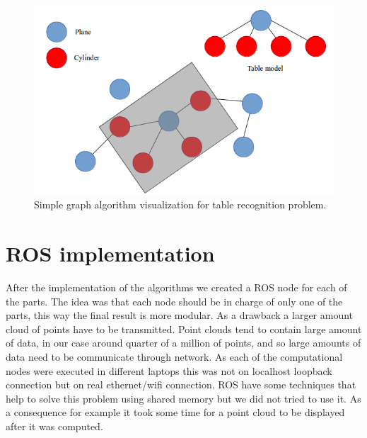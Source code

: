 \documentclass[fontsize=12pt]{article}
\begin{document}
\begin{figure}
  \includegraphics[scale=0.5]{images/graph}
  \caption{Simple graph algorithm visualization for table recognition problem.}
  \label{graphAlg}
\end{figure}
\section{ROS implementation} 
\label{sec:ros_implementation}

After the implementation of the algorithms we created a ROS node for each of the parts. The idea was that each node should be in charge of only one of the parts, this way the final result is more modular. As a drawback a larger amount cloud of points have to be transmitted. Point clouds tend to contain large amount of data, in our case around quarter of a million of points, and so large amounts of data need to be communicate through network. As each of the computational nodes were executed in different laptops this was not on localhost loopback connection but on real ethernet/wifi connection. ROS have some techniques that help to solve this problem using shared memory but we did not tried to use it. As a consequence for example it took some time for a point cloud to be displayed after it was computed. 
\end{document}
